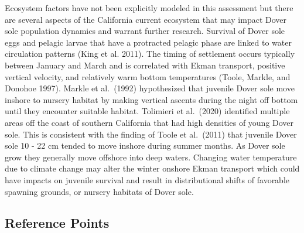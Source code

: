 \documentclass[11pt,
  english,
  a4paper,
]{article}
\begin{document}
Ecosystem factors have not been explicitly modeled in this assessment but there are several aspects of the California current ecosystem that may impact Dover sole population dynamics and warrant further research. Survival of Dover sole eggs and pelagic larvae that have a protracted pelagic phase are linked to water circulation patterns {(King et al. 2011)\leavevmode\tagmcend\tagstructend}. The timing of settlement occurs typically between January and March and is correlated with Ekman transport, positive vertical velocity, and relatively warm bottom temperatures {(Toole, Markle, and Donohoe 1997)\leavevmode\tagmcend\tagstructend}. Markle et al.~{(1992)\leavevmode\tagmcend\tagstructend} hypothesized that juvenile Dover sole move inshore to nursery habitat by making vertical ascents during the night off bottom until they encounter suitable habitat. Tolimieri et al.~{(2020)\leavevmode\tagmcend\tagstructend} identified multiple areas off the coast of southern California that had high densities of young Dover sole. This is consistent with the finding of Toole et al.~{(2011)\leavevmode\tagmcend\tagstructend} that juvenile Dover sole 10 - 22 cm tended to move inshore during summer months. As Dover sole grow they generally move offshore into deep waters. Changing water temperature due to climate change may alter the winter onshore Ekman transport which could have impacts on juvenile survival and result in distributional shifts of favorable spawning grounds, or nursery habitats of Dover sole.

\leavevmode\tagmcend\tagstructend\par


\hypertarget{reference-points}{%
\subsection*{Reference Points}\label{reference-points}}

\leavevmode\tagmcend\tagstructend

\end{document}
